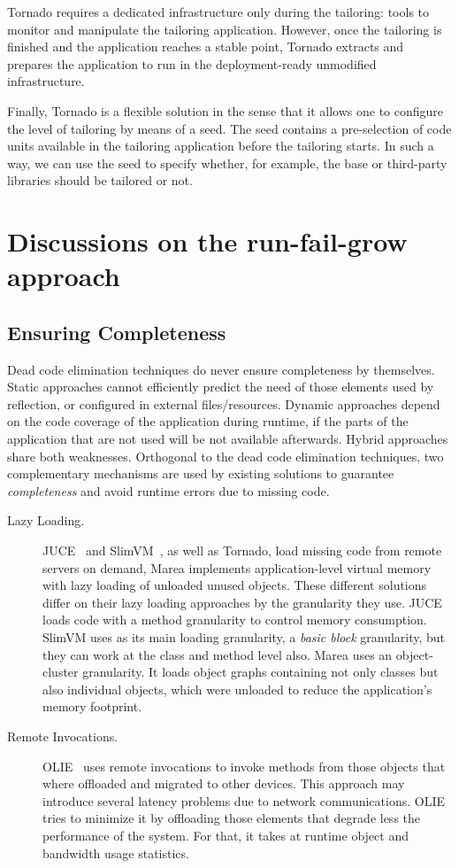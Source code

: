 Tornado requires a dedicated infrastructure only during the tailoring: tools to monitor and manipulate the tailoring application. However, once the tailoring is finished and the application reaches a stable point, Tornado extracts and prepares the application to run in the deployment-ready unmodified infrastructure.

Finally, Tornado is a flexible solution in the sense that it allows one to configure the level of tailoring by means of a seed. The seed contains a pre-selection of code units available in the tailoring application before the tailoring starts. In such a way, we can use the seed to specify whether, for example, the base or third-party libraries should be tailored or not.

\section{Discussions on the run-fail-grow approach} \label{sec:discussion}

\subsection{Ensuring Completeness} \label{section:safety}

Dead code elimination techniques do never ensure completeness by themselves. Static approaches cannot efficiently predict the need of those elements used by reflection, or configured in external files/resources. Dynamic approaches depend on the code coverage of the application during runtime, \ie if the parts of the application that are not used will be not available afterwards. Hybrid approaches share both weaknesses. Orthogonal to the dead code elimination techniques, two complementary mechanisms are used by existing solutions to guarantee \emph{completeness} and avoid runtime errors due to missing code.

\begin{description}
\item[Lazy Loading.] JUCE~\cite{Popa04a,Teod01a} and SlimVM~\cite{Kers09a, Wagn11a}, as well as Tornado, load missing code from remote servers on demand, Marea\cite{Mart12a} implements application-level virtual memory with lazy loading of unloaded unused objects. These different solutions differ on their lazy loading approaches by the granularity they use. JUCE loads code with a method granularity to control memory consumption. SlimVM uses as its main loading granularity, a \emph{basic block} granularity, but they can work at the class and method level also. Marea uses an object-cluster granularity. It loads object graphs containing not only classes but also individual objects, which were unloaded to reduce the application's memory footprint.
\item[Remote Invocations.] OLIE~\cite{Gu03a} uses remote invocations to invoke methods from those objects that where offloaded and migrated to other devices. This approach may introduce several latency problems due to network communications. OLIE tries to minimize it by offloading those elements that degrade less the performance of the system. For that, it takes at runtime object and bandwidth usage statistics.
\end{description}

